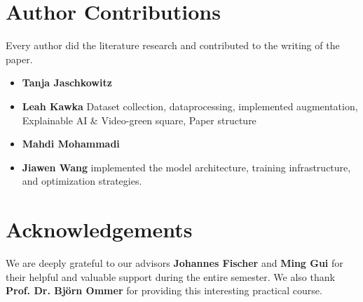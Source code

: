 \clearpage
\setcounter{page}{1}
\maketitlesupplementary

\renewcommand{\thesection}{\arabic{section}}

\section{Author Contributions}
\label{sec:author}
Every author did the literature research and contributed to the writing of the paper. 
% 
\begin{itemize}
    \item \textbf{Tanja Jaschkowitz} 
    \item \textbf{Leah Kawka} Dataset collection, dataprocessing, implemented augmentation, Explainable AI \& Video-green square, Paper structure
    \item \textbf{Mahdi Mohammadi}
    \item \textbf{Jiawen Wang} implemented the model architecture, training infrastructure, and optimization strategies.
\end{itemize}
% 

\section*{Acknowledgements}

We are deeply grateful to our advisors \textbf{Johannes Fischer} and \textbf{Ming Gui} for their helpful and valuable support during the entire semester. 
We also thank \textbf{Prof. Dr. Björn Ommer} for providing this interesting practical course.